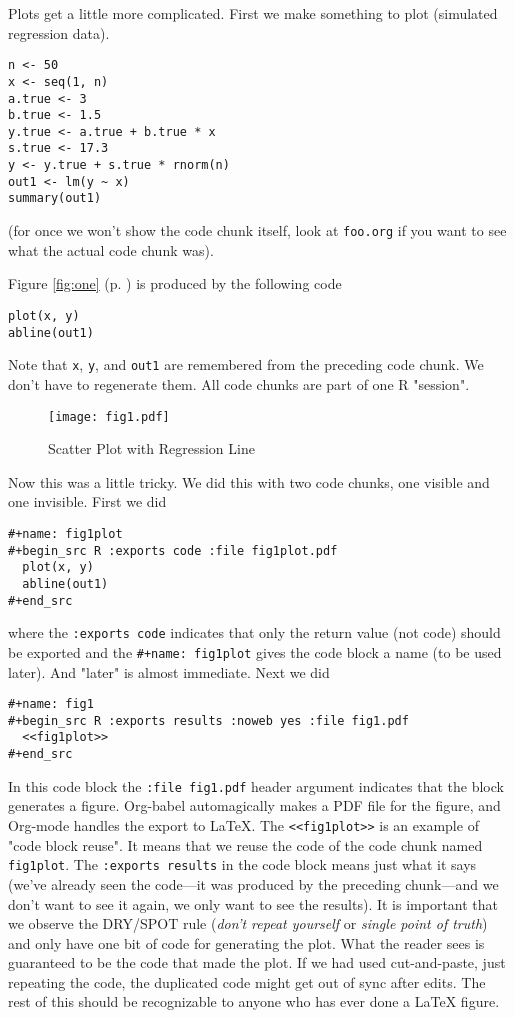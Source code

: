 \documentclass[11pt]{article}
\begin{document}
\pagebreak[3]

Plots get a little more complicated.  First we make something to plot
(simulated regression data).
\begin{verbatim}
n <- 50
x <- seq(1, n)
a.true <- 3
b.true <- 1.5
y.true <- a.true + b.true * x
s.true <- 17.3
y <- y.true + s.true * rnorm(n)
out1 <- lm(y ~ x)
summary(out1)
\end{verbatim}
(for once we won't show the code chunk itself, look at \texttt{foo.org} if
you want to see what the actual code chunk was).

Figure \ref{fig:one} (p. \pageref{fig:one}) is produced by the following code
\begin{verbatim}
plot(x, y)
abline(out1)
\end{verbatim}
Note that \texttt{x}, \texttt{y}, and \texttt{out1} are remembered from the preceding code
chunk.  We don't have to regenerate them.  All code chunks are part of
one R "session".
\begin{figure}[htbp]
\centering
\texttt{[image: fig1.pdf]}
\caption{\label{fig:orgdc5b1a1}
Scatter Plot with Regression Line}
\end{figure}

Now this was a little tricky.  We did this with two code chunks,
one visible and one invisible.  First we did
\begin{verbatim}
#+name: fig1plot
#+begin_src R :exports code :file fig1plot.pdf
  plot(x, y)
  abline(out1)
#+end_src
\end{verbatim}

where the \texttt{:exports code} indicates that only the return value (not
code) should be exported and the \texttt{\#+name: fig1plot} gives the code
block a name (to be used later).  And "later" is almost immediate.
Next we did
\begin{verbatim}
#+name: fig1
#+begin_src R :exports results :noweb yes :file fig1.pdf
  <<fig1plot>>
#+end_src
\end{verbatim}


In this code block the \texttt{:file fig1.pdf} header argument indicates that
the block generates a figure.  Org-babel automagically makes a PDF
file for the figure, and Org-mode handles the export to \LaTeX{}.  The
\texttt{<<fig1plot>>} is an example of "code block reuse".  It means that we
reuse the code of the code chunk named \texttt{fig1plot}.  The \texttt{:exports
results} in the code block means just what it says (we've already seen
the code---it was produced by the preceding chunk---and we don't want
to see it again, we only want to see the results).  It is important
that we observe the DRY/SPOT rule (\emph{don't repeat yourself} or \emph{single
point of truth}) and only have one bit of code for generating the
plot.  What the reader sees is guaranteed to be the code that made the
plot.  If we had used cut-and-paste, just repeating the code, the
duplicated code might get out of sync after edits.  The rest of this
should be recognizable to anyone who has ever done a \LaTeX{} figure.
\end{document}

